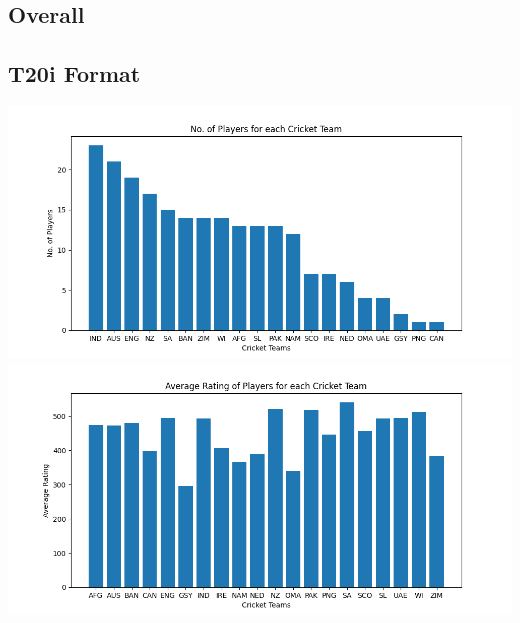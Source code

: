 \documentclass{article}
\begin{document}
\begin{normalsize}
        \newpage

        \section{Overall}\label{sec:overall}
            \subsection{T20i Format}\label{subsec:t20i}
                \includegraphics[scale=0.7]{overall_t20i-1}
                \vspace{1em}\\
                \includegraphics[scale=0.7]{overall_t20i-2}
            \newpage

\end{normalsize}
\end{document}
